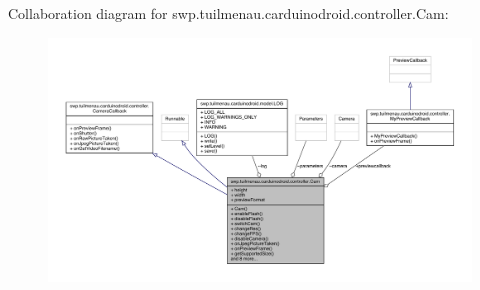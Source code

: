 Collaboration diagram for swp.\+tuilmenau.\+carduinodroid.\+controller.\+Cam\+:
\nopagebreak
\begin{figure}[H]
\begin{center}
\leavevmode
\includegraphics[width=350pt]{classswp_1_1tuilmenau_1_1carduinodroid_1_1controller_1_1_cam__coll__graph}
\end{center}
\end{figure}
